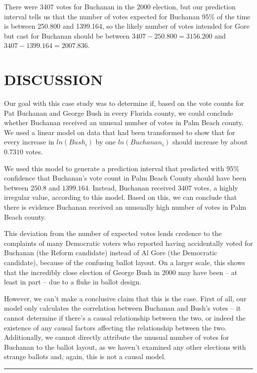 \documentclass[
  letterpaper,
  DIV=11,
  numbers=noendperiod]{scrartcl}
\begin{document}
There were 3407 votes for Buchanan in the 2000 election, but our
prediction interval tells us that the number of votes expected for
Buchanan 95\% of the time is between 250.800 and 1399.164, so the likely
number of votes intended for Gore but cast for Buchanan should be
between \(3407-250.800 = 3156.200\) and \(3407-1399.164 = 2007.836\).

\hypertarget{discussion}{%
\section{DISCUSSION}\label{discussion}}

Our goal with this case study was to determine if, based on the vote
counts for Pat Buchanan and George Bush in every Florida county, we
could conclude whether Buchanan received an unusual number of votes in
Palm Beach county. We used a linear model on data that had been
transformed to show that for every increase in \(ln(Bush_i)\) by one
\(ln(Buchanan_i)\) should increase by about \(0.7310\) votes.

We used this model to generate a prediction interval that predicted with
95\% confidence that Buchanan's vote count in Palm Beach County should
have been between \(250.8\) and \(1399.164\). Instead, Buchanan received
\(3407\) votes, a highly irregular value, according to this model. Based
on this, we can conclude that there is evidence Buchanan received an
unusually high number of votes in Palm Beach county.

This deviation from the number of expected votes lends credence to the
complaints of many Democratic voters who reported having accidentally
voted for Buchanan (the Reform candidate) instead of Al Gore (the
Democratic candidate), because of the confusing ballot layout. On a
larger scale, this shows that the incredibly close election of George
Bush in 2000 may have been -- at least in part -- due to a fluke in
ballot design.

However, we can't make a conclusive claim that this is the case. First
of all, our model only calculates the correlation between Buchanan and
Bush's votes -- it cannot determine if there's a causal relationship
between the two, or indeed the existence of any causal factors affecting
the relationship between the two. Additionally, we cannot directly
attribute the unusual number of votes for Buchanan to the ballot layout,
as we haven't examined any other elections with strange ballots and,
again, this is not a causal model.

\begin{center}\rule{0.5\linewidth}{0.5pt}\end{center}
\end{document}
